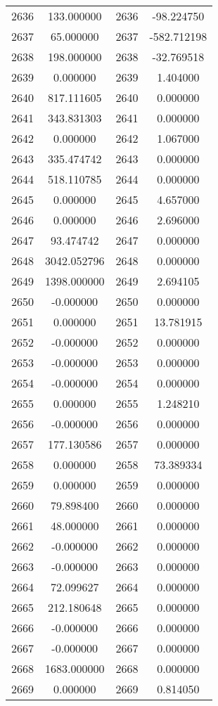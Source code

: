 \documentclass[12pt]{article}
\begin{document}
\begin{longtable}{@{}cccc@{}}
2636 & 133.000000 & 2636 & -98.224750 \\
2637 & 65.000000 & 2637 & -582.712198 \\
2638 & 198.000000 & 2638 & -32.769518 \\
2639 & 0.000000 & 2639 & 1.404000 \\
2640 & 817.111605 & 2640 & 0.000000 \\
2641 & 343.831303 & 2641 & 0.000000 \\
2642 & 0.000000 & 2642 & 1.067000 \\
2643 & 335.474742 & 2643 & 0.000000 \\
2644 & 518.110785 & 2644 & 0.000000 \\
2645 & 0.000000 & 2645 & 4.657000 \\
2646 & 0.000000 & 2646 & 2.696000 \\
2647 & 93.474742 & 2647 & 0.000000 \\
2648 & 3042.052796 & 2648 & 0.000000 \\
2649 & 1398.000000 & 2649 & 2.694105 \\
2650 & -0.000000 & 2650 & 0.000000 \\
2651 & 0.000000 & 2651 & 13.781915 \\
2652 & -0.000000 & 2652 & 0.000000 \\
2653 & -0.000000 & 2653 & 0.000000 \\
2654 & -0.000000 & 2654 & 0.000000 \\
2655 & 0.000000 & 2655 & 1.248210 \\
2656 & -0.000000 & 2656 & 0.000000 \\
2657 & 177.130586 & 2657 & 0.000000 \\
2658 & 0.000000 & 2658 & 73.389334 \\
2659 & 0.000000 & 2659 & 0.000000 \\
2660 & 79.898400 & 2660 & 0.000000 \\
2661 & 48.000000 & 2661 & 0.000000 \\
2662 & -0.000000 & 2662 & 0.000000 \\
2663 & -0.000000 & 2663 & 0.000000 \\
2664 & 72.099627 & 2664 & 0.000000 \\
2665 & 212.180648 & 2665 & 0.000000 \\
2666 & -0.000000 & 2666 & 0.000000 \\
2667 & -0.000000 & 2667 & 0.000000 \\
2668 & 1683.000000 & 2668 & 0.000000 \\
2669 & 0.000000 & 2669 & 0.814050 \\

\end{longtable}
\end{document}
